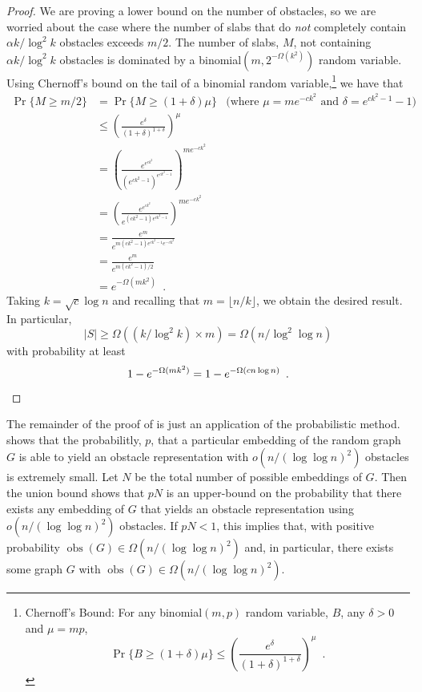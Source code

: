 \documentclass{patmorin}
\DeclareMathOperator{\obs}{obs}
\begin{document}
\begin{proof}
We are proving a lower bound on the number of obstacles, so we are worried
about the case where the number of slabs that do \emph{not} completely
contain $\alpha k/\log^2 k$ obstacles exceeds $m/2$.  The number of
slabs, $M$, not containing $\alpha k/\log^2 k$ obstacles is dominated
by a binomial$(m,2^{-\Omega(k^2)})$ random variable.  Using Chernoff's
bound on the tail of a binomial random
variable,\footnote{%
  Chernoff's Bound: For any binomial$(m,p)$ random variable, $B$,
  any $\delta>0$ and $\mu=mp$, 
  \[ \Pr\{B\ge (1+\delta)\mu\}
     \le \left(\frac{e^{\delta}}{(1+\delta)^{1+\delta}}\right)^{\mu} 
       \enspace . 
  \]}
we have that
\begin{align*}
  \Pr\{M \ge m/2\} & = \Pr\{M\ge (1+\delta)\mu\}
    & \text{(where $\mu=me^{-ck^2}$ and $\delta=e^{ck^2-1}-1$)} \\
    & \le \left(\frac{e^{\delta}}{(1+\delta)^{1+\delta}}\right)^{\mu} \\
    & = \left(\frac{e^{e^{ck^2}}}{(e^{ck^2-1})^{e^{ck^2-1}}}\right)^{me^{-ck^2}}\\
    & = \left(\frac{e^{e^{ck^2}}}{e^{(ck^2-1)e^{ck^2-1}}}\right)^{me^{-ck^2}}\\
    & = \frac{e^{m}}{e^{m(ck^2-1)e^{ck^2-1}e^{-ck^2}}} \\
    & = \frac{e^{m}}{e^{m(ck^2-1)/2}} \\
    & = e^{-\Omega(mk^2)} \enspace .
\end{align*}
Taking $k=\sqrt{c}\log n$ and recalling that $m=\lfloor n/k\rfloor$, we obtain
the desired result.  In particular,
\[
    |S| \ge \Omega\left(\left(k/\log^2 k\right)\times m \right)
      = \Omega\left(n/\log^2\log n\right)
\]
with probability at least
\[
    1-e^{-\Omega(mk^2)} = 1-e^{-\Omega(cn\log n)} \enspace . \qedhere
\]
\end{proof}

The remainder of the proof of  is just an application of
the probabilistic method.   shows that the probabilitly,
$p$, that a particular embedding of the random graph $G$ is able to
yield an obstacle representation with $o(n/(\log\log n)^2)$ obstacles is
extremely small.  Let $N$ be the total number of possible embeddings
of $G$.  Then the union bound shows that $p N$ is an upper-bound on the
probability that there exists any embedding of $G$ that yields an obstacle
representation using $o(n/(\log\log n)^2)$ obstacles.  If $pN <1$, this
implies that, with positive probability $\obs(G)\in \Omega(n/(\log\log
n)^2)$ and, in particular, there exists some graph $G$ with $\obs(G)\in
\Omega(n/(\log\log n)^2)$.
\end{document}
